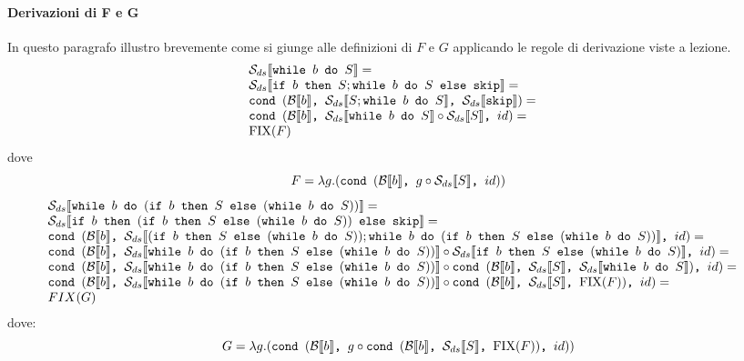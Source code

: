 {\paragraph{Derivazioni di F e G}
In questo paragrafo illustro brevemente come si giunge alle definizioni di $F$ e $G$ applicando 
le regole di derivazione viste a lezione.
$$
\begin{array}{ll}
\dsCtxt{\wbS{b}{S}} = & \\
\dsCtxt{\ifABC{b}{S; \wbS{b}{S}}{\skipForFriends}} = & \\
\cond{b}{\dsCtxt{S; \wbS{b}{S}}}{\dsCtxt{\skipForFriends}} = & \\
\cond{b}{\dsCtxt{\wbS{b}{S}} \circ \dsCtxt{S}}{id} = & \\
\fixp{F}
\end{array}
$$
dove 
$$
F = \lambda g. (\cond{b}{g \circ \dsCtxt{S}}{id})
$$
$$
\begin{array}{ll}
\dsCtxt{\wbS{b}{(\ifABC{b}{S}{(\wbS{b}{S})})}} = & \\
\dsCtxt{\ifABC{b}{(\ifABC{b}{S}{(\wbS{b}{S})})}{\skipForFriends}} = & \\
\cond
{b}
{\dsCtxt{(\ifABC{b}{S}{(\wbS{b}{S})}); \wbS{b}{(\ifABC{b}{S}{(\wbS{b}{S})})}}}
{id}
= & \\
\cond{b}
{\dsCtxt{\wbS{b}{(\ifABC{b}{S}{(\wbS{b}{S})})}} \circ
	\dsCtxt{\ifABC{b}{S}{(\wbS{b}{S})}}}{id} = & \\
\cond{b}
{
	\dsCtxt{\wbS{b}{(\ifABC{b}{S}{(\wbS{b}{S})})}} \circ
	\cond{b}{\dsCtxt{S}}{\dsCtxt{\wbS{b}{S}}}
}{id} =  & \\
\cond{b}
{
	\dsCtxt{\wbS{b}{(\ifABC{b}{S}{(\wbS{b}{S})})}} \circ
	\cond{b}{\dsCtxt{S}}{\fixp{F}}
}{id} = & \\
FIX(G)
\end{array}
$$
dove:
$$
G = \lambda g .(\cond{b}{g \circ \cond{b}{\dsCtxt{S}}{\fixp{F}}}{id})
$$
}
